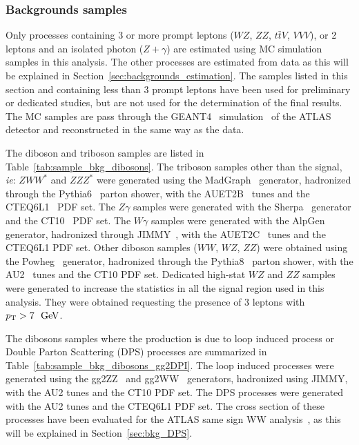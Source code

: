 

\subsubsection{Backgrounds samples}
\label{sec:subsection_datasets_MC}

Only processes containing 3 or more prompt
leptons ($WZ$, $ZZ$, $t\bar{t}V$, $VVV$), or 2 leptons and an 
isolated photon ($Z+\gamma$) are estimated using MC simulation 
samples in this analysis. The other processes are estimated from 
data as this will be explained in Section~\ref{sec:backgrounds_estimation}. 
The samples listed in this section and containing less than 3 prompt leptons 
have been used for preliminary or dedicated studies, but are not used for 
the determination of the final results. The MC samples are pass through the 
GEANT4~\cite{Agostinelli:2002hh} simulation~\cite{Aad:2010ah} of the ATLAS 
detector and reconstructed in the same way as the data.

The diboson and triboson samples are listed in Table~\ref{tab:sample_bkg_dibosons}. The triboson samples other than the signal, \textit{ie}: $ZWW^{*}$ and $ZZZ^{*}$ were generated using the MadGraph~\cite{Alwall_madgraph} generator, hadronized through the Pythia6~\cite{PYTHIA} parton shower, with the AUET2B~\cite{ATL-PHYS-PUB-2011-009} tunes and the CTEQ6L1~\cite{Pumplin:2002vw} PDF set. The $Z\gamma$ samples were generated with the Sherpa~\cite{sherpa} generator and the CT10~\cite{Guzzi:2011sv} PDF set. The $W\gamma$ samples were generated with the AlpGen~\cite{ALPGEN} generator, hadronized through JIMMY~\cite{Jimmy}, with the AUET2C~\cite{ATL-PHYS-PUB-2011-009} tunes and the CTEQ6L1 PDF set. Other diboson samples ($WW$, $WZ$, $ZZ$) were obtained using the Powheg~\cite{Alioli:2008gx,Nason:2004rx,Frixione:2007vw,Alioli:2010xd} generator, hadronized through the Pythia8~\cite{Sjostrand:2007gs} parton shower, with the AU2~\cite{atlasmctunes} tunes and the CT10 PDF set. Dedicated high-stat $WZ$ and $ZZ$ samples were generated to increase the statistics in all the signal region used in this analysis. They were obtained requesting the presence of 3 leptons with $\pt>7~\GeV$.

The dibosons samples where the production is due to loop induced process or Double Parton Scattering (DPS) processes are summarized in Table~\ref{tab:sample_bkg_dibosons_gg2DPI}. The loop induced processes were generated using the gg2ZZ~\cite{Binoth:2008pr} and gg2WW~\cite{Binoth:2006mf} generators, hadronized using JIMMY, with the AU2 tunes and the CT10 PDF set. The DPS processes were generated with the AU2 tunes and the CTEQ6L1 PDF set. The cross section of these processes have been evaluated for the ATLAS same sign WW analysis~\cite{Aad:2014zda}, as this will be explained in Section~\ref{sec:bkg_DPS}.

